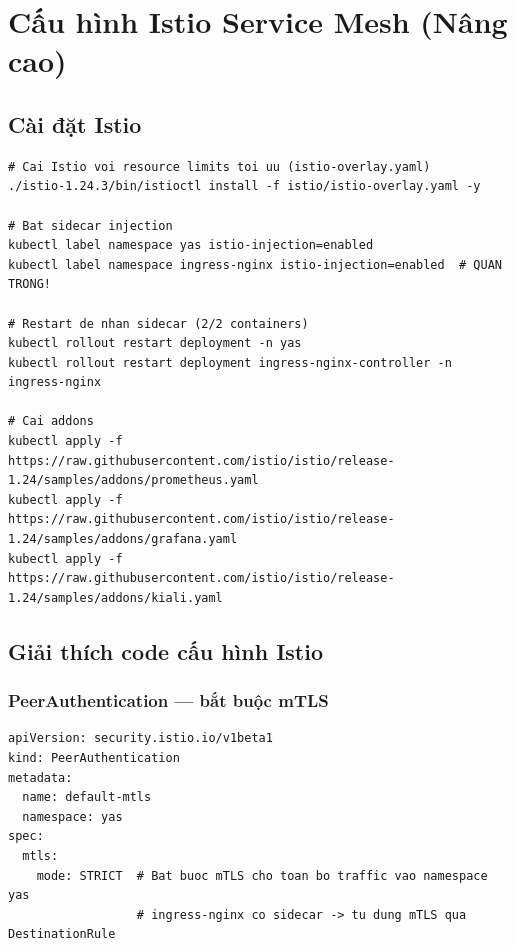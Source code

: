 \section{Cấu hình Istio Service Mesh (Nâng cao)}

\subsection{Cài đặt Istio}

\begin{lstlisting}[style=bashstyle, caption=Cài Istio với profile tối ưu]
# Cai Istio voi resource limits toi uu (istio-overlay.yaml)
./istio-1.24.3/bin/istioctl install -f istio/istio-overlay.yaml -y

# Bat sidecar injection
kubectl label namespace yas istio-injection=enabled
kubectl label namespace ingress-nginx istio-injection=enabled  # QUAN TRONG!

# Restart de nhan sidecar (2/2 containers)
kubectl rollout restart deployment -n yas
kubectl rollout restart deployment ingress-nginx-controller -n ingress-nginx

# Cai addons
kubectl apply -f https://raw.githubusercontent.com/istio/istio/release-1.24/samples/addons/prometheus.yaml
kubectl apply -f https://raw.githubusercontent.com/istio/istio/release-1.24/samples/addons/grafana.yaml
kubectl apply -f https://raw.githubusercontent.com/istio/istio/release-1.24/samples/addons/kiali.yaml
\end{lstlisting}

\subsection{Giải thích code cấu hình Istio}

\subsubsection{PeerAuthentication — bắt buộc mTLS}

\begin{lstlisting}[style=yamlstyle, caption=istio/peer-authentication.yaml]
apiVersion: security.istio.io/v1beta1
kind: PeerAuthentication
metadata:
  name: default-mtls
  namespace: yas
spec:
  mtls:
    mode: STRICT  # Bat buoc mTLS cho toan bo traffic vao namespace yas
                  # ingress-nginx co sidecar -> tu dung mTLS qua DestinationRule
\end{lstlisting}


